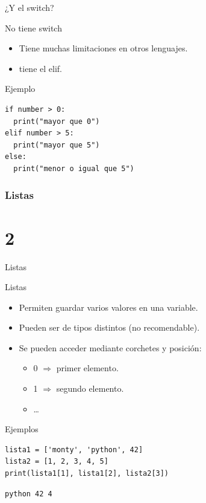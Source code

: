 \documentclass[bigger,unknownkeysallowed]{beamer}
\begin{document}
\begin{frame}[fragile,label={sec:org4fc366f}]{¿Y el switch?}
 \begin{block}{No tiene switch}
\begin{itemize}
\item Tiene muchas limitaciones en otros lenguajes.

\item tiene el \alert{elif}.
\end{itemize}
\end{block}

\begin{exampleblock}{Ejemplo}
\begin{verbatim}
if number > 0: 
  print("mayor que 0")
elif number > 5:
  print("mayor que 5")
else:
  print("menor o igual que 5")
\end{verbatim}
\end{exampleblock}
\end{frame}

\section{Listas}
\label{sec:org1e848d5}
\part{2}

\begin{frame}[fragile,label={sec:org5a22b64}]{Listas}
 \begin{block}{Listas}
\begin{itemize}
\item Permiten guardar varios valores en una variable.

\item Pueden ser de tipos distintos (no recomendable).
\item Se pueden acceder mediante corchetes y posición:
\begin{itemize}
\item 0 \(\Rightarrow\) primer elemento.
\item 1 \(\Rightarrow\) segundo elemento.
\item \ldots{}
\end{itemize}
\end{itemize}
\end{block}

\begin{block}{Ejemplos}
\begin{verbatim}
lista1 = ['monty', 'python', 42]
lista2 = [1, 2, 3, 4, 5]
print(lista1[1], lista1[2], lista2[3])
\end{verbatim}
\scriptsize
\begin{verbatim}
python 42 4
\end{verbatim}
\end{block}
\end{frame}
\end{document}
